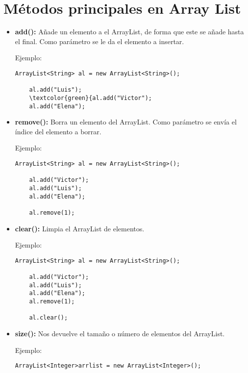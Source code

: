\documentclass[12pt, letterpaper]{article} %
\begin{document}
\section*{Métodos principales en Array List}
\begin{itemize}
    \item \textbf{add():} Añade un elemento a el ArrayList, de forma que este se añade hasta el final. Como parámetro se le da el elemento a insertar.
    
    Ejemplo:
    \lstset{language = Java, breaklines=true, basicstyle=\footnotesize}
    \begin{lstlisting}[frame=single]
    ArrayList<String> al = new ArrayList<String>();
    
    al.add("Luis");
    \textcolor{green}{al.add("Victor");
    al.add("Elena");
    \end{lstlisting}
    
    \item \textbf{remove():} Borra un elemento del ArrayList. Como parámetro se envía el índice del elemento a borrar.
    
    Ejemplo:
    \lstset{language = Java, breaklines=true, basicstyle=\footnotesize}
    \begin{lstlisting}[frame=single]
    ArrayList<String> al = new ArrayList<String>();

    al.add("Victor");    
    al.add("Luis");    
    al.add("Elena");
    
    al.remove(1);
    \end{lstlisting}
    
    \item \textbf{clear():} Limpia el ArrayList de elementos.
    
    Ejemplo:
    \lstset{language = Java, breaklines=true, basicstyle=\footnotesize}
    \begin{lstlisting}[frame=single]
    ArrayList<String> al = new ArrayList<String>();

    al.add("Victor");
    al.add("Luis");
    al.add("Elena");
    al.remove(1);

    al.clear();
    \end{lstlisting}
    
    \item \textbf{size():} Nos devuelve el tamaño o número de elementos del ArrayList.
    
    Ejemplo:
    \lstset{language = Java, breaklines=true, basicstyle=\footnotesize}
    \begin{lstlisting}[frame=single]
    ArrayList<Integer>arrlist = new ArrayList<Integer>();
    

\end{lstlisting}
\end{itemize}
\end{document}
